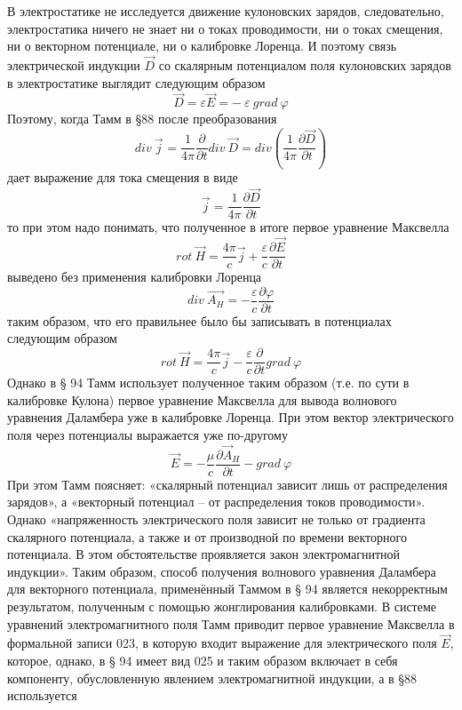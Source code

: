 \documentclass[11pt]{article}
\begin{document}
В электростатике не исследуется движение кулоновских зарядов,
следовательно, электростатика ничего не знает ни о токах проводимости,
ни о токах смещения, ни о векторном потенциале, ни о калибровке Лоренца.
И поэтому связь электрической индукции \(\overrightarrow{D}\) со
скалярным потенциалом поля кулоновских зарядов в электростатике выглядит
следующим образом
\[\overrightarrow{D}=\varepsilon \overrightarrow{E}=-\ \varepsilon \ grad\ \varphi \]
Поэтому, когда Тамм в §88 после преобразования
\[div\ {{\overrightarrow{j}}_{}}=\frac{1}{4\pi }\frac{\partial }{\partial t}div\ \overrightarrow{D}=div\left( \frac{1}{4\pi }\frac{\partial \overrightarrow{D}}{\partial t} \right)\]
дает выражение для тока смещения в виде
\[{{\overrightarrow{j}}_{}}=\frac{1}{4\pi }\frac{\partial \overrightarrow{D}}{\partial t}\]
то при этом надо понимать, что полученное в итоге первое уравнение
Максвелла
\[rot\ \overrightarrow{H}=\frac{4\pi }{c}\overrightarrow{j}+\frac{\varepsilon }{c}\frac{\partial \overrightarrow{E}}{\partial t}\]
выведено без применения калибровки Лоренца
\[div\ \overrightarrow{{{A}_{H}}}=-\frac{\varepsilon }{c}\frac{\partial \varphi }{\partial t}\]
таким образом, что его правильнее было бы записывать в потенциалах
следующим образом
\[rot\ \overrightarrow{H}=\frac{4\pi }{c}\overrightarrow{j}-\frac{\varepsilon }{c}\frac{\partial }{\partial t}grad\ \varphi \]
Однако в § 94 Тамм использует полученное таким образом (т.е. по сути в
калибровке Кулона) первое уравнение Максвелла для вывода волнового
уравнения Даламбера уже в калибровке Лоренца. При этом вектор
электрического поля через потенциалы выражается уже по-другому
\[\overrightarrow{E}=-\frac{\mu }{c}\frac{\partial {{\overrightarrow{A}}_{H}}}{\partial t}-grad\ \varphi \]
При этом Тамм поясняет: «скалярный потенциал зависит лишь от
распределения зарядов», а «векторный потенциал -- от распределения токов
проводимости». Однако «напряженность электрического поля зависит не
только от градиента скалярного потенциала, а также и от производной по
времени векторного потенциала. В этом обстоятельстве проявляется закон
электромагнитной индукции». Таким образом, способ получения волнового
уравнения Даламбера для векторного потенциала, применённый Таммом в § 94
является некорректным результатом, полученным с помощью жонглирования
калибровками. В системе уравнений электромагнитного поля Тамм приводит
первое уравнение Максвелла в формальной записи 023, в которую входит
выражение для электрического поля \(\overrightarrow{E}\), которое,
однако, в § 94 имеет вид 025 и таким образом включает в себя компоненту,
обусловленную явлением электромагнитной индукции, а в §88 используется
\end{document}
